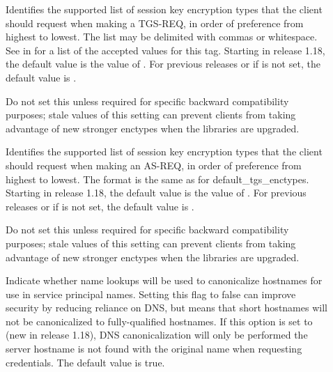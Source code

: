 \documentclass[letterpaper,10pt,english]{sphinxmanual}
\begin{document}
\begin{description}
\item[{}] \leavevmode
Identifies the supported list of session key encryption types that
the client should request when making a TGS-REQ, in order of
preference from highest to lowest.  The list may be delimited with
commas or whitespace.  See {\hyperref[\detokenize{admin/conf_files/kdc_conf:encryption-types}]{}} in
{\hyperref[\detokenize{admin/conf_files/kdc_conf:kdc-conf-5}]{}} for a list of the accepted values for this tag.
Starting in release 1.18, the default value is the value of
.  For previous releases or if
 is not set, the default value is
.

Do not set this unless required for specific backward
compatibility purposes; stale values of this setting can prevent
clients from taking advantage of new stronger enctypes when the
libraries are upgraded.

\item[{}] \leavevmode
Identifies the supported list of session key encryption types that
the client should request when making an AS-REQ, in order of
preference from highest to lowest.  The format is the same as for
default\_tgs\_enctypes.  Starting in release 1.18, the default
value is the value of .  For previous
releases or if  is not set, the default
value is .

Do not set this unless required for specific backward
compatibility purposes; stale values of this setting can prevent
clients from taking advantage of new stronger enctypes when the
libraries are upgraded.

\item[{}] \leavevmode
Indicate whether name lookups will be used to canonicalize
hostnames for use in service principal names.  Setting this flag
to false can improve security by reducing reliance on DNS, but
means that short hostnames will not be canonicalized to
fully-qualified hostnames.  If this option is set to  (new
in release 1.18), DNS canonicalization will only be performed the
server hostname is not found with the original name when
requesting credentials.  The default value is true.


\end{description}
\end{document}
